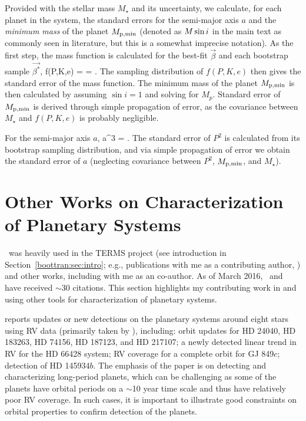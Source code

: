 Provided with the stellar mass $M_\star$ and its uncertainty, we
calculate, for each planet in the system, the standard errors for the
semi-major axis $a$ and the {\it minimum mass} of the planet $M_{\rm
  p,min}$ (denoted as $M\sin{i}$ in the main text as commonly seen in
literature, but this is a somewhat imprecise notation). As the first
step, the mass function is calculated for the best-fit $\vec{\beta}$
and each bootstrap sample $\vec{\beta^*}$,
\beq
f(P,K,e) =  = .
\eeq
The sampling distribution of $f(P,K,e)$ then gives the standard error
of the mass function. The minimum mass of the planet $M_{\rm p,min}$ 
is then calculated by assuming $\sin{i}=1$ and solving for $M_p$.
Standard error of $M_{\rm p,min}$ is derived through simple
propagation of error, as the covariance between $M_\star$ and
$f(P,K,e)$ is probably negligible.

For the semi-major axis $a$,
\beq
a^3 =  \approx {}.
\eeq
The standard error of $P^2$ is calculated from its bootstrap sampling
distribution, and via simple propagation of error we obtain the
standard error of $a$ (neglecting covariance between $P^2$, $M_{\rm
  p,min}$, and $M_\star$).


\section{Other Works on Characterization of Planetary Systems}

\boottran\ was heavily used in the TERMS project (see introduction in
Section~\ref{boottran:sec:intro}; e.g., publications with me as a
contributing author, \citealt{2013ApJ...768..155H,
  2012ApJ...754...37D, 2011ApJ...737...58K, 2011ApJ...735L..41K}) and
other works, including \cite{2015ApJ...800...22F} with me as an
co-author. As of March 2016, \boottran\ and \cite{wang2012} have
received $\sim$30 citations. This section highlights my contributing
work in \cite{2015ApJ...800...22F} and \cite{2013ApJ...768..155H}
using other tools for characterization of planetary systems.

\cite{2015ApJ...800...22F} reports updates or new detections on the
planetary systems around eight stars using RV data (primarily taken by
\keck), including: orbit updates for HD 24040, HD 183263, HD
74156, HD 187123, and HD 217107; a newly detected linear trend in RV
for the HD 66428 system; RV coverage for a complete orbit for GJ
849$c$; detection of HD 145934$b$. The emphasis of the paper is on
detecting and characterizing long-period planets, which can be
challenging as some of the planets have orbital periods on a $\sim$10
year time scale and thus have relatively poor RV
coverage. In such cases, it is important to illustrate good
constraints on orbital properties to confirm detection of the
planets. 


